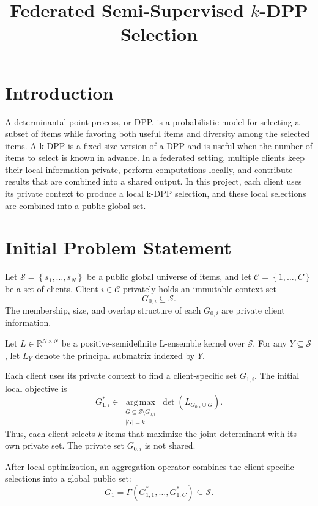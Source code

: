\documentclass[11pt]{article}
\title{Federated Semi-Supervised $k$-DPP Selection}
\author{}
\date{}
\newcommand{\set}[1]{\left\{#1\right\}}
\newcommand{\card}[1]{\left\lvert#1\right\rvert}
\newcommand{\union}{\mathbin{\cup}}
\begin{document}
\maketitle

\section{Introduction}

A determinantal point process, or DPP, is a probabilistic model for selecting a
subset of items while favoring both useful items and diversity among the
selected items. A k-DPP is a fixed-size version of a DPP and is useful when the
number of items to select is known in advance. In a federated setting, multiple
clients keep their local information private, perform computations locally,
and contribute results that are combined into a shared output. In this project,
each client uses its private context to produce a local k-DPP selection, and
these local selections are combined into a public global set.

\section{Initial Problem Statement}

Let $\mathcal{S}=\set{s_1,\ldots,s_N}$ be a public global universe of
items, and let $\mathcal{C}=\set{1,\ldots,C}$ be a set of clients. Client
$i\in\mathcal{C}$ privately holds an immutable context set
\[
  G_{0,i} \subseteq \mathcal{S}.
\]
The membership, size, and overlap structure of each $G_{0,i}$ are private
client information.

Let $L \in \mathbb{R}^{N \times N}$ be a positive-semidefinite L-ensemble
kernel over $\mathcal{S}$. For any $Y \subseteq \mathcal{S}$,
let $L_Y$ denote the principal submatrix indexed by $Y$.

Each client uses its private context to find a client-specific set $G_{1,i}$.
The initial local objective is
\begin{equation}
  G_{1,i}^{*}
  \in
  \operatorname*{arg\,max}_{\substack{
    G\subseteq\mathcal{S}\setminus G_{0,i}\\
    \card{G}=k}}
  \det\!\left(L_{G_{0,i}\union G}\right).
  \label{eq:local-map}
\end{equation}
Thus, each client selects $k$ items that maximize the joint determinant with
its own private set. The private set $G_{0,i}$ is not shared.

After local optimization, an aggregation operator combines the client-specific
selections into a global public set:
\begin{equation}
  G_1
  =
  \Gamma\!\left(G_{1,1}^{*},\ldots,G_{1,C}^{*}\right)
  \subseteq \mathcal{S}.
  \label{eq:global-aggregation}
\end{equation}
\end{document}
